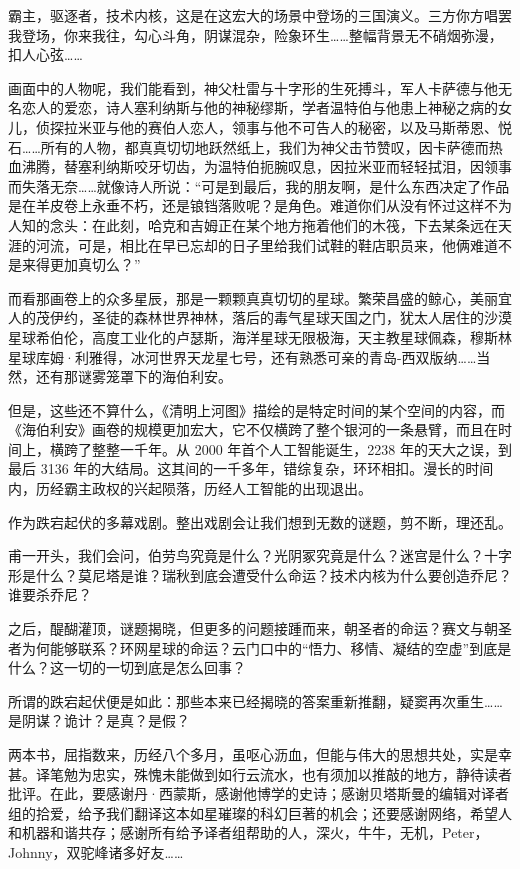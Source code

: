 \documentclass[AutoFakeBold=true]{book}
\begin{document}
霸主，驱逐者，技术内核，这是在这宏大的场景中登场的三国演义。三方你方唱罢我登场，你来我往，勾心斗角，阴谋混杂，险象环生……整幅背景无不硝烟弥漫，扣人心弦……

画面中的人物呢，我们能看到，神父杜雷与十字形的生死搏斗，军人卡萨德与他无名恋人的爱恋，诗人塞利纳斯与他的神秘缪斯，学者温特伯与他患上神秘之病的女儿，侦探拉米亚与他的赛伯人恋人，领事与他不可告人的秘密，以及马斯蒂恩、悦石……所有的人物，都真真切切地跃然纸上，我们为神父击节赞叹，因卡萨德而热血沸腾，替塞利纳斯咬牙切齿，为温特伯扼腕叹息，因拉米亚而轻轻拭泪，因领事而失落无奈……就像诗人所说：``可是到最后，我的朋友啊，是什么东西决定了作品是在羊皮卷上永垂不朽，还是锒铛落败呢？是角色。难道你们从没有怀过这样不为人知的念头：在此刻，哈克和吉姆正在某个地方拖着他们的木筏，下去某条远在天涯的河流，可是，相比在早已忘却的日子里给我们试鞋的鞋店职员来，他俩难道不是来得更加真切么？''

而看那画卷上的众多星辰，那是一颗颗真真切切的星球。繁荣昌盛的鲸心，美丽宜人的茂伊约，圣徒的森林世界神林，落后的毒气星球天国之门，犹太人居住的沙漠星球希伯伦，高度工业化的卢瑟斯，海洋星球无限极海，天主教星球佩森，穆斯林星球库姆·利雅得，冰河世界天龙星七号，还有熟悉可亲的青岛-西双版纳……当然，还有那谜雾笼罩下的海伯利安。

但是，这些还不算什么，《清明上河图》描绘的是特定时间的某个空间的内容，而《海伯利安》画卷的规模更加宏大，它不仅横跨了整个银河的一条悬臂，而且在时间上，横跨了整整一千年。从 2000 年首个人工智能诞生，2238 年的天大之误，到最后 3136 年的大结局。这其间的一千多年，错综复杂，环环相扣。漫长的时间内，历经霸主政权的兴起陨落，历经人工智能的出现退出。

作为跌宕起伏的多幕戏剧。整出戏剧会让我们想到无数的谜题，剪不断，理还乱。

甫一开头，我们会问，伯劳鸟究竟是什么？光阴冢究竟是什么？迷宫是什么？十字形是什么？莫尼塔是谁？瑞秋到底会遭受什么命运？技术内核为什么要创造乔尼？谁要杀乔尼？

之后，醍醐灌顶，谜题揭晓，但更多的问题接踵而来，朝圣者的命运？赛文与朝圣者为何能够联系？环网星球的命运？云门口中的``悟力、移情、凝结的空虚''到底是什么？这一切的一切到底是怎么回事？

所谓的跌宕起伏便是如此：那些本来已经揭晓的答案重新推翻，疑窦再次重生……是阴谋？诡计？是真？是假？

两本书，屈指数来，历经八个多月，虽呕心沥血，但能与伟大的思想共处，实是幸甚。译笔勉为忠实，殊愧未能做到如行云流水，也有须加以推敲的地方，静待读者批评。在此，要感谢丹·西蒙斯，感谢他博学的史诗；感谢贝塔斯曼的编辑对译者组的拾爱，给予我们翻译这本如星璀璨的科幻巨著的机会；还要感谢网络，希望人和机器和谐共存；感谢所有给予译者组帮助的人，深火，牛牛，无机，Peter，Johnny，双驼峰诸多好友……
\end{document}
